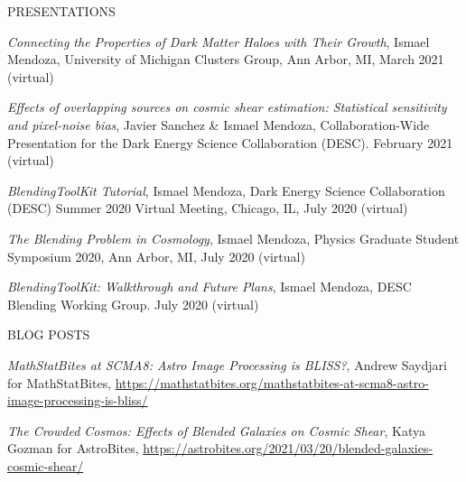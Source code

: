 \documentclass{resume} %
\begin{document}
\begin{rSection}{PRESENTATIONS}
\item \textit{Connecting the Properties of Dark Matter Haloes with Their Growth}, Ismael Mendoza, University of Michigan Clusters Group, Ann Arbor, MI, March 2021 (virtual)
%
\item \textit{Effects of overlapping sources on cosmic shear estimation: Statistical sensitivity and pixel-noise bias}, Javier Sanchez \& Ismael Mendoza, Collaboration-Wide Presentation for the Dark Energy Science Collaboration (DESC). February 2021 (virtual)
%
%
\item \textit{BlendingToolKit Tutorial}, Ismael Mendoza, Dark Energy Science Collaboration (DESC) Summer 2020 Virtual Meeting, Chicago, IL, July 2020 (virtual)
%
\item \textit{The Blending Problem in Cosmology}, Ismael Mendoza, Physics Graduate Student Symposium 2020, Ann Arbor, MI, July 2020 (virtual)
%
\item \textit{BlendingToolKit: Walkthrough and Future Plans}, Ismael Mendoza, DESC Blending Working Group. July 2020 (virtual)
\end{rSection}


\begin{rSection}{BLOG POSTS}
%
\vspace*{-1em}

\item \textit{MathStatBites at SCMA8: Astro Image Processing is BLISS?}, Andrew Saydjari for MathStatBites, \url{https://mathstatbites.org/mathstatbites-at-scma8-astro-image-processing-is-bliss/}

\item \textit{The Crowded Cosmos: Effects of Blended Galaxies on Cosmic Shear}, Katya Gozman for AstroBites, \url{https://astrobites.org/2021/03/20/blended-galaxies-cosmic-shear/}

\end{rSection}
\end{document}
